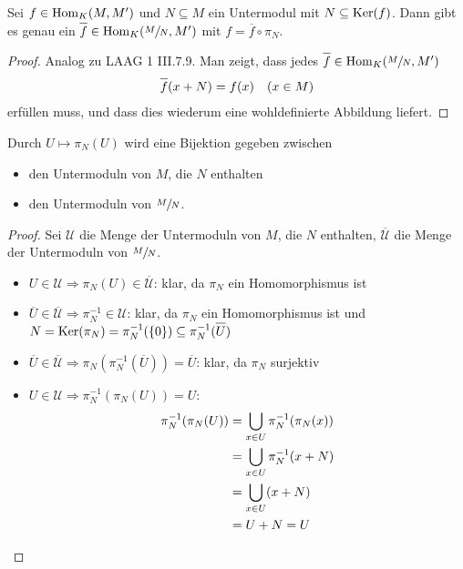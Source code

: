 \begin{proposition}
	Sei $f\in\operatorname{Hom}_K(M,M')$ und $N\subseteq M$ ein Untermodul mit $N\subseteq \operatorname{Ker}(f)$. Dann gibt es genau ein $\overline{f}\in\Hom_K(\qraum{M}{N},M')$ mit $f=\overline{f}\circ \pi_N$.
	\begin{center}
	\end{center}
\end{proposition}
\begin{proof}
	Analog zu LAAG 1 III.7.9. Man zeigt, dass jedes $\overline{f}\in\Hom_K(\qraum{M}{N},M')$
	\begin{align}
		\overline{f}(x+N)=f(x)\quad (x\in M)\notag
	\end{align}
	erfüllen muss, und dass dies wiederum eine wohldefinierte Abbildung liefert. %
\end{proof}

\begin{lemma}
	Durch $U\mapsto \pi_N(U)$ wird eine Bijektion gegeben zwischen
	\begin{itemize}
		\item den Untermoduln von $M$, die $N$ enthalten
		\item den Untermoduln von $\sfrac{M}{N}$.
	\end{itemize}
\end{lemma}
\begin{proof}
	Sei $\mathcal{U}$ die Menge der Untermoduln von $M$, die $N$ enthalten, $\overline{\mathcal{U}}$ die Menge der Untermoduln von $\sfrac{M}{N}$.
	\begin{itemize}
		\item $U\in\mathcal{U}\Rightarrow \pi_N(U)\in\overline{\mathcal{U}}$: klar, da $\pi_N$ ein Homomorphismus ist
		\item $\overline{U}\in\overline{\mathcal{U}}\Rightarrow \pi_N^{-1}\in\mathcal{U}$: klar, da $\pi_N$ ein Homomorphismus ist und $N=\Ker(\pi_N)=\pi_N^{-1}(\{0\})\subseteq \pi_N^{-1}(\overline{U})$
		\item $\overline{U}\in\overline{\mathcal{U}}\Rightarrow\pi_N(\pi_N^{-1}(\overline{U}))=\overline{U}$: klar, da $\pi_N$ surjektiv
		\item $U\in\mathcal{U}\Rightarrow \pi_N^{-1}(\pi_N(U))=U$:
		\begin{align}
			\pi_N^{-1}(\pi_N(U)) &= \bigcup_{x\in U} \pi_N^{-1}(\pi_N(x)) \notag \\
			&= \bigcup_{x\in U} \pi_N^{-1}(x+N) \notag \\
			&= \bigcup_{x\in U}(x+N) \notag \\
			&= U+N=U\notag
		\end{align}
	\end{itemize}
\end{proof}